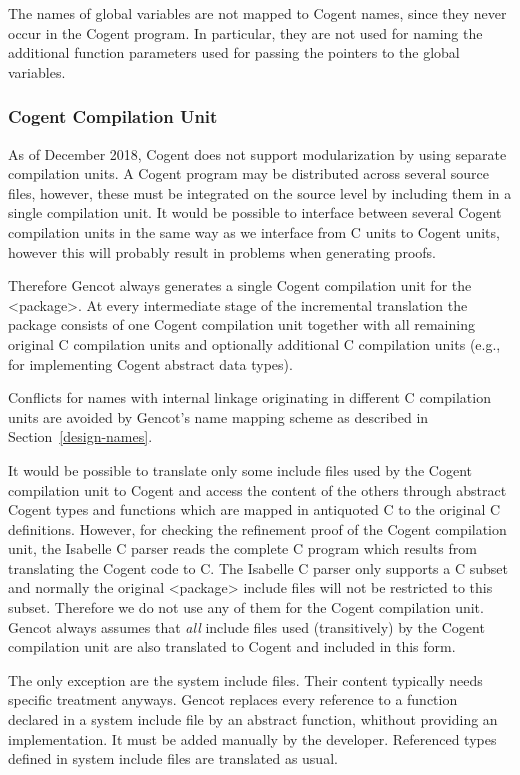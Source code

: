 The names of global variables are not mapped to Cogent names, since they never occur in the Cogent program. In particular, they are 
not used for naming the additional function parameters used for passing the pointers to the global variables.

\subsubsection{Cogent Compilation Unit}

As of December 2018, Cogent does not support modularization by using separate compilation units. A Cogent program may be distributed
across several source files, however, these must be integrated on the source level by including them in a single compilation unit.
It would be possible to interface between several Cogent compilation units in the same way as we interface from C units to Cogent
units, however this will probably result in problems when generating proofs. 

Therefore Gencot always generates a single Cogent compilation unit for the <package>. 
At every intermediate stage of the incremental translation the package consists of one Cogent compilation unit 
together with all remaining original C compilation units and optionally additional C compilation units (e.g., for implementing 
Cogent abstract data types).

Conflicts for names with internal linkage originating in different C compilation units are avoided by Gencot's name mapping scheme
as described in Section~\ref{design-names}.

It would be possible to translate only some include files used by the Cogent compilation unit to Cogent and access the content
of the others through abstract Cogent types and functions which are mapped in antiquoted C to the original C definitions. 
However, for checking the refinement proof of the Cogent compilation unit, the Isabelle C parser reads the complete C program
which results from translating the Cogent code to C. The Isabelle C parser only supports a C subset and normally the original
<package> include files will not be restricted to this subset. Therefore we do not use any of them for the Cogent compilation
unit. Gencot always assumes that \textit{all} include files used (transitively) by the Cogent compilation unit are also translated
to Cogent and included in this form.

The only exception are the system include files. Their content typically needs specific treatment anyways. Gencot replaces every 
reference to a function declared in a system include file by an abstract function, whithout providing an implementation. 
It must be added manually by the developer. Referenced types defined in system include files are translated as usual.

